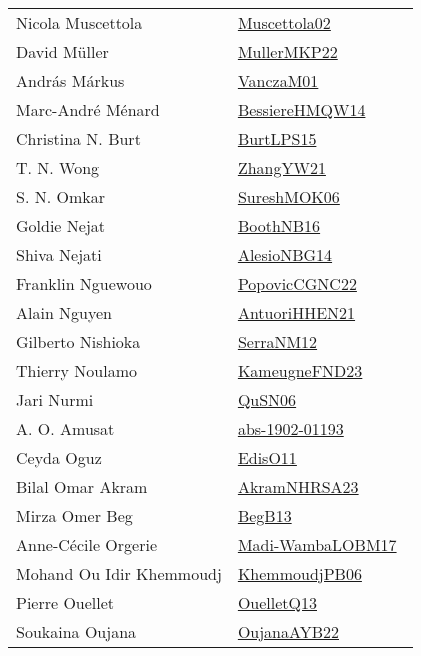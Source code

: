 {\begin{longtable}{p{4cm}p{20cm}}
Nicola Muscettola & \href{works/Muscettola02.pdf}{Muscettola02}~\cite{Muscettola02}\\
David M{\"{u}}ller & \href{works/MullerMKP22.pdf}{MullerMKP22}~\cite{MullerMKP22}\\
Andr{\'{a}}s M{\'{a}}rkus & \href{works/VanczaM01.pdf}{VanczaM01}~\cite{VanczaM01}\\
Marc{-}Andr{\'{e}} M{\'{e}}nard & \href{works/BessiereHMQW14.pdf}{BessiereHMQW14}~\cite{BessiereHMQW14}\\
Christina N. Burt & \href{works/BurtLPS15.pdf}{BurtLPS15}~\cite{BurtLPS15}\\
T. N. Wong & \href{works/ZhangYW21.pdf}{ZhangYW21}~\cite{ZhangYW21}\\
S. N. Omkar & \href{}{SureshMOK06}~\cite{SureshMOK06}\\
Goldie Nejat & \href{works/BoothNB16.pdf}{BoothNB16}~\cite{BoothNB16}\\
Shiva Nejati & \href{works/AlesioNBG14.pdf}{AlesioNBG14}~\cite{AlesioNBG14}\\
Franklin Nguewouo & \href{works/PopovicCGNC22.pdf}{PopovicCGNC22}~\cite{PopovicCGNC22}\\
Alain Nguyen & \href{works/AntuoriHHEN21.pdf}{AntuoriHHEN21}~\cite{AntuoriHHEN21}\\
Gilberto Nishioka & \href{works/SerraNM12.pdf}{SerraNM12}~\cite{SerraNM12}\\
Thierry Noulamo & \href{works/KameugneFND23.pdf}{KameugneFND23}~\cite{KameugneFND23}\\
Jari Nurmi & \href{works/QuSN06.pdf}{QuSN06}~\cite{QuSN06}\\
A. O. Amusat & \href{works/abs-1902-01193.pdf}{abs-1902-01193}~\cite{abs-1902-01193}\\
Ceyda Oguz & \href{works/EdisO11.pdf}{EdisO11}~\cite{EdisO11}\\
Bilal Omar Akram & \href{works/AkramNHRSA23.pdf}{AkramNHRSA23}~\cite{AkramNHRSA23}\\
Mirza Omer Beg & \href{works/BegB13.pdf}{BegB13}~\cite{BegB13}\\
Anne{-}C{\'{e}}cile Orgerie & \href{works/Madi-WambaLOBM17.pdf}{Madi-WambaLOBM17}~\cite{Madi-WambaLOBM17}\\
Mohand Ou Idir Khemmoudj & \href{works/KhemmoudjPB06.pdf}{KhemmoudjPB06}~\cite{KhemmoudjPB06}\\
Pierre Ouellet & \href{works/OuelletQ13.pdf}{OuelletQ13}~\cite{OuelletQ13}\\
Soukaina Oujana & \href{works/OujanaAYB22.pdf}{OujanaAYB22}~\cite{OujanaAYB22}\\

\end{longtable}}
